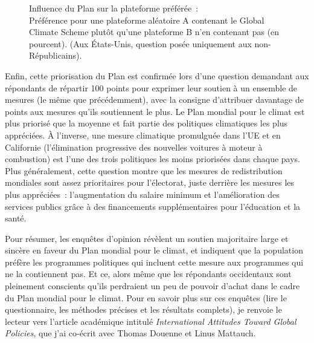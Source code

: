 \documentclass[a5paper,french]{memoir}
\begin{document}
\begin{figure}[h!] %
  \caption[Influence du Plan sur la plateforme préférée]{Influence du Plan sur la plateforme préférée~:\\ Préférence pour une plateforme aléatoire A contenant le Global Climate Scheme plutôt qu'une plateforme B n'en contenant pas (en pourcent). (Aux États-Unis, question posée uniquement aux non-Républicains).}\label{fig:conjoint_left_ag_b}
\end{figure}

Enfin, cette priorisation du Plan est confirmée lors d'une question demandant aux répondants de répartir 100 points pour exprimer leur soutien à un ensemble de mesures (le même que précédemment), avec la consigne d'attribuer davantage de points aux mesures qu'ils soutiennent le plus. Le Plan mondial pour le climat est plus priorisé que la moyenne et fait partie des politiques climatiques les plus appréciées. À l'inverse, une mesure climatique promulguée dans l'UE et en Californie (l'élimination progressive des nouvelles voitures à moteur à combustion) est l'une des trois politiques les moins priorisées dans chaque pays. Plus généralement, cette question montre que les mesures de redistribution mondiales sont assez prioritaires pour l'électorat, juste derrière les mesures les plus appréciées~: l'augmentation du salaire minimum et l'amélioration des services publics grâce à des financements supplémentaires pour l'éducation et la santé.

Pour résumer, les enquêtes d'opinion révèlent un soutien majoritaire large et sincère en faveur du Plan mondial pour le climat, et indiquent que la population préfère les programmes politiques qui incluent cette mesure aux programmes qui ne la contiennent pas. Et ce, alors même que les répondants occidentaux sont pleinement conscients qu'ils perdraient un peu de pouvoir d'achat dans le cadre du Plan mondial pour le climat. Pour en savoir plus sur ces enquêtes (lire le questionnaire, les méthodes précises et les résultats complets), je renvoie le lecteur vers l'article académique intitulé \textit{International Attitudes Toward Global Policies}, que j'ai co-écrit avec Thomas Douenne et Linus Mattauch.
\end{document}
